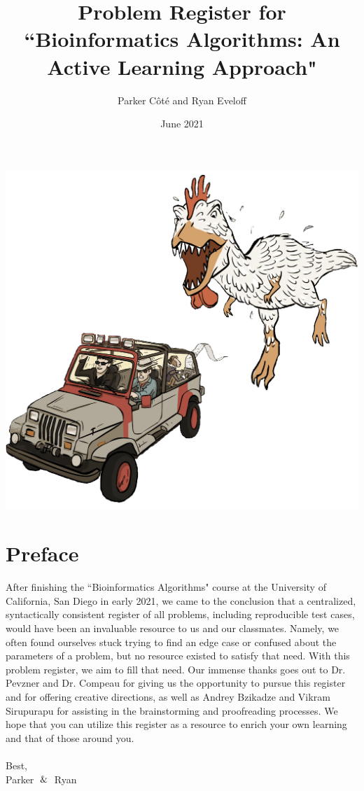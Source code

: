 \documentclass{article}
\title{Problem Register for ``Bioinformatics Algorithms: An Active Learning Approach"}
\author{Parker Côté and Ryan Eveloff}
\date{June 2021}
\begin{document}
\maketitle
\begin{center}
    \includegraphics[scale=0.25]{c0/c0_transparent.png}
\end{center}
\pagebreak

\section*{Preface}
After finishing the ``Bioinformatics Algorithms" course at the University of California, San Diego in early 2021, we came to the conclusion that a centralized, syntactically consistent register of all problems, including reproducible test cases, would have been an invaluable resource to us and our classmates. Namely, we often found ourselves stuck trying to find an edge case or confused about the parameters of a problem, but no resource existed to satisfy that need. With this problem register, we aim to fill that need. Our immense thanks goes out to Dr. Pevzner and Dr. Compeau for giving us the opportunity to pursue this register and for offering creative directions, as well as Andrey Bzikadze and Vikram Sirupurapu for assisting in the brainstorming and proofreading processes. We hope that you can utilize this register as a resource to enrich your own learning and that of those around you. \\ \\
\noindent Best, \\
\noindent Parker $\And$ Ryan
\end{document}
